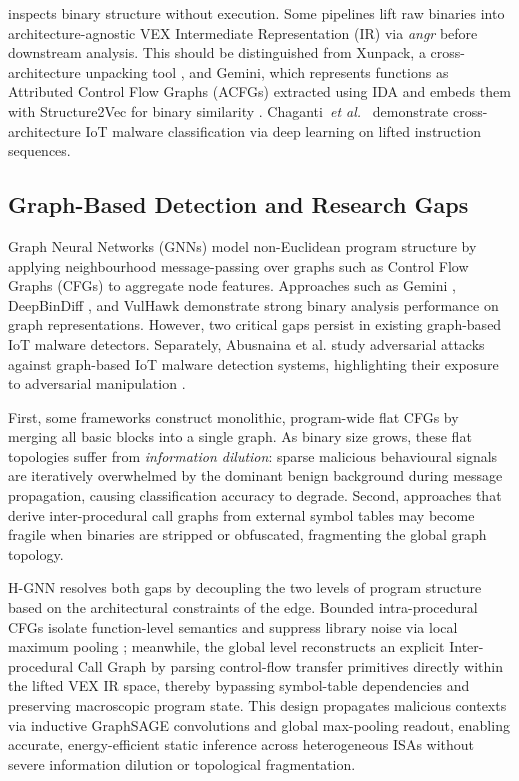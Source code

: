\documentclass[conference]{IEEEtran}
\begin{document}
 inspects binary structure without
execution. Some pipelines lift raw binaries into architecture-agnostic
VEX Intermediate Representation (IR) via \textit{angr} before downstream
analysis.
This should be distinguished from Xunpack, a cross-architecture
unpacking tool \cite{b4}, and Gemini, which represents functions as
Attributed Control Flow Graphs (ACFGs) extracted using IDA and embeds them
with Structure2Vec for binary similarity \cite{b8}.
Chaganti~\textit{et al.}~\cite{b5} demonstrate cross-architecture
IoT malware classification via deep learning on lifted instruction
sequences.

\subsection{Graph-Based Detection and Research Gaps}

Graph Neural Networks (GNNs) model non-Euclidean program
structure by applying neighbourhood message-passing over graphs such as
Control Flow Graphs (CFGs) to aggregate node features.
Approaches such as Gemini \cite{b8}, DeepBinDiff \cite{b9}, and VulHawk
\cite{b10} demonstrate strong binary analysis performance on
graph representations. However, two critical gaps persist
in existing graph-based IoT malware detectors.
Separately, Abusnaina et al. study adversarial attacks against
graph-based IoT malware detection systems, highlighting their exposure to
adversarial manipulation \cite{b6}.

First, some frameworks construct monolithic, program-wide
flat CFGs by merging all basic blocks into a single graph.
As binary size grows, these flat topologies suffer
from \textit{information dilution}: sparse malicious
behavioural signals are iteratively overwhelmed by the
dominant benign background during message propagation, causing
classification accuracy to degrade. Second, approaches that derive
inter-procedural call graphs from external symbol tables may become fragile
when binaries are stripped or obfuscated, fragmenting the global graph
topology.

H-GNN resolves both gaps by decoupling the two levels of program structure based 
on the architectural constraints of the edge. Bounded intra-procedural CFGs isolate 
function-level semantics and suppress library noise via local maximum pooling \cite{b6}; 
meanwhile, the global level reconstructs an explicit Inter-procedural Call Graph 
by parsing control-flow transfer primitives directly within the lifted VEX IR space, 
thereby bypassing symbol-table dependencies and preserving macroscopic program state. 
This design propagates malicious contexts via inductive GraphSAGE convolutions and 
global max-pooling readout, enabling accurate, energy-efficient static inference 
across heterogeneous ISAs without severe information dilution or topological fragmentation.
\end{document}
